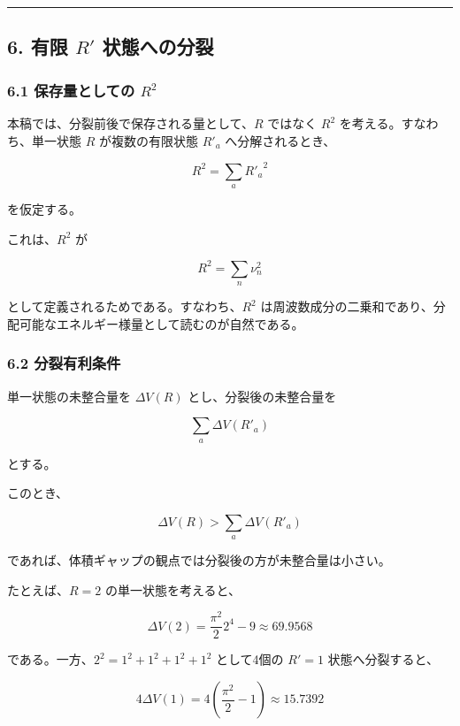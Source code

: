 \documentclass[
]{ltjsarticle}
\begin{document}
\begin{center}\rule{0.5\linewidth}{0.5pt}\end{center}

\subsection{\texorpdfstring{6. 有限 \(R'\)
状態への分裂}{6. 有限 R\textquotesingle{} 状態への分裂}}\label{ux6709ux9650-r-ux72b6ux614bux3078ux306eux5206ux88c2}

\subsubsection{\texorpdfstring{6.1 保存量としての
\(R^2\)}{6.1 保存量としての R\^{}2}}\label{ux4fddux5b58ux91cfux3068ux3057ux3066ux306e-r2}

本稿では、分裂前後で保存される量として、\(R\) ではなく \(R^2\)
を考える。すなわち、単一状態 \(R\) が複数の有限状態 \(R'_a\)
へ分解されるとき、

\[
R^2=\sum_a {R'_a}^2
\]

を仮定する。

これは、\(R^2\) が

\[
R^2=\sum_n\nu_n^2
\]

として定義されるためである。すなわち、\(R^2\)
は周波数成分の二乗和であり、分配可能なエネルギー様量として読むのが自然である。

\subsubsection{6.2
分裂有利条件}\label{ux5206ux88c2ux6709ux5229ux6761ux4ef6}

単一状態の未整合量を \(\Delta V(R)\) とし、分裂後の未整合量を

\[
\sum_a \Delta V(R'_a)
\]

とする。

このとき、

\[
\Delta V(R)>\sum_a\Delta V(R'_a)
\]

であれば、体積ギャップの観点では分裂後の方が未整合量は小さい。

たとえば、\(R=2\) の単一状態を考えると、

\[
\Delta V(2)=\frac{\pi^2}{2}2^4-9\approx69.9568
\]

である。一方、\(2^2=1^2+1^2+1^2+1^2\) として4個の \(R'=1\)
状態へ分裂すると、

\[
4\Delta V(1)=4\left(\frac{\pi^2}{2}-1\right)\approx15.7392
\]
\end{document}
